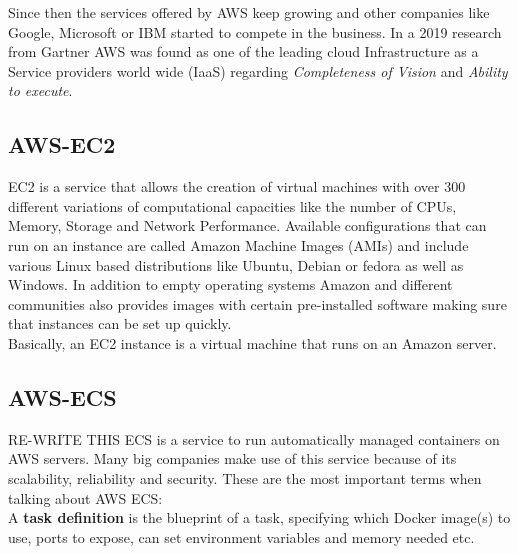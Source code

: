 Since then the services offered by AWS keep growing and other companies like Google, Microsoft or IBM started to compete in the business. In a 2019 research from Gartner AWS was found as one of the leading cloud Infrastructure as a Service providers world wide (IaaS) \cite{Gartner} 
regarding \emph{Completeness of Vision} and \emph{Ability to execute}. 

\subsection{AWS-EC2}
EC2 is a service that allows the creation of virtual machines with over 300 different variations of computational capacities like the number of CPUs, Memory, Storage and Network Performance. \cite{AwsEc2} 
Available configurations that can run on an instance are called Amazon Machine Images (AMIs) and include various Linux based distributions like Ubuntu, Debian or fedora as well as Windows. In addition to empty operating systems Amazon and different communities also provides images with certain pre-installed software making sure that instances can be set up quickly. \\
Basically, an EC2 instance is a virtual machine that runs on an Amazon server. \cite{Ec2VirtualMachine}


\subsection{AWS-ECS}
RE-WRITE THIS
ECS is a service to run automatically managed containers on AWS servers. Many big companies make use of this service because of its scalability, reliability and security. \cite{AwsEc2}
These are the most important terms when talking about AWS ECS: \\

A \textbf{task definition} is the blueprint of a task, specifying which Docker image(s) to use, ports to expose, can set environment variables and memory needed etc. \cite{CodeCampEcs}

